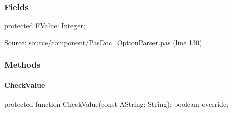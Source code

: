 \documentclass{report}
\newif\ifpdf
\begin{document}
\subsubsection*{\large{\textbf{Fields}}\normalsize\hspace{1ex}\hfill}
\begin{list}{}{
\setlength{\itemindent}{0cm}
\setlength{\listparindent}{0cm}
\setlength{\leftmargin}{\evensidemargin}
\addtolength{\leftmargin}{\tmplength}
\settowidth{\labelsep}{X}
\addtolength{\leftmargin}{\labelsep}
\setlength{\labelwidth}{\tmplength}
}
\label{PasDoc_OptionParser.TIntegerOption-FValue}
\item[\textbf{FValue}\hfill]
\ifpdf
\begin{flushleft}
\fi
\begin{ttfamily}
protected FValue: Integer;\end{ttfamily}

\ifpdf
\end{flushleft}
\fi


\par  \par
\href{https://github.com/pasdoc/pasdoc/blob/master/source/component/PasDoc_OptionParser.pas#L130}{Source: source/component/PasDoc{\_}OptionParser.pas (line 130).}\end{list}
\subsubsection*{\large{\textbf{Methods}}\normalsize\hspace{1ex}\hfill}
\paragraph*{CheckValue}\hspace*{\fill}

\label{PasDoc_OptionParser.TIntegerOption-CheckValue}
\begin{list}{}{
\setlength{\itemindent}{0cm}
\setlength{\listparindent}{0cm}
\setlength{\leftmargin}{\evensidemargin}
\addtolength{\leftmargin}{\tmplength}
\settowidth{\labelsep}{X}
\addtolength{\leftmargin}{\labelsep}
\setlength{\labelwidth}{\tmplength}
}
\item[\textbf{Declaration}\hfill]
\ifpdf
\begin{flushleft}
\fi
\begin{ttfamily}
protected function CheckValue(const AString: String): boolean; override;\end{ttfamily}

\ifpdf
\end{flushleft}
\fi

\end{list}
\ifpdf
\end{document}
